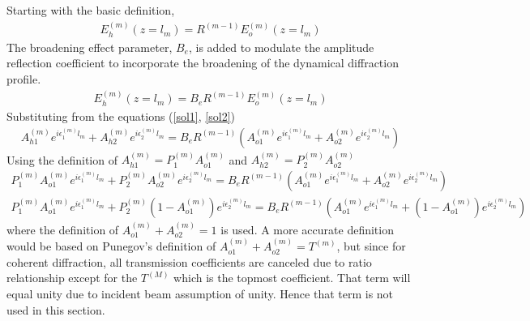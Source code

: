 Starting with the basic definition,
\begin{align}
E_h^{(m)}(z=l_m) =  R^{(m-1)} E_o^{(m)}(z=l_m)
\end{align}
The broadening effect parameter, $B_e$, is added to modulate the amplitude reflection coefficient to incorporate the broadening of the dynamical diffraction profile.
\begin{align}
E_h^{(m)}(z=l_m) = B_e R^{(m-1)} E_o^{(m)}(z=l_m)
\end{align}
Substituting from  the equations (\ref{sol1}, \ref{sol2})
\begin{align}
A_{h1}^{(m)} e^{i \epsilon_1^{(m)} l_m}+A_{h2}^{(m)} e^{i \epsilon_2^{(m)} l_m}= B_e R^{(m-1)}(A_{o1}^{(m)} e^{i \epsilon_1^{(m)} l_m}+A_{o2}^{(m)} e^{i \epsilon_2^{(m)} l_m}) 
\end{align}
Using the definition of $A_{h1}^{(m)}=P_1^{(m)} A_{o1}^{(m)} $ and $A_{h2}^{(m)}=P_2^{(m)} A_{o2}^{(m)} $
\begin{align}
P_1^{(m)} A_{o1}^{(m)} e^{i \epsilon_1^{(m)} l_m}+ P_2^{(m)}A_{o2}^{(m)} e^{i \epsilon_2^{(m)} l_m}=B_e R^{(m-1)}(A_{o1}^{(m)} e^{i \epsilon_1^{(m)} l_m}+A_{o2}^{(m)} e^{i \epsilon_2^{(m)} l_m})\\
P_1^{(m)} A_{o1}^{(m)} e^{i \epsilon_1^{(m)} l_m}+ P_2^{(m)}(1-A_{o1}^{(m)}) e^{i \epsilon_2^{(m)} l_m}=B_e R^{(m-1)}(A_{o1}^{(m)} e^{i \epsilon_1^{(m)} l_m}+(1-A_{o1}^{(m)}) e^{i \epsilon_2^{(m)} l_m})
\end{align}
where the definition of $A_{o1}^{(m)} + A_{o2}^{(m)}=1$ is used.  A more accurate definition would be based on Punegov's definition of $A_{o1}^{(m)} + A_{o2}^{(m)}=T^{(m)}$, but since for coherent diffraction, all transmission coefficients are canceled due to ratio relationship except for the $T^{(M)}$ which is the topmost coefficient.  That term will equal unity due to incident beam assumption of unity.  Hence that term is not used in this section.
